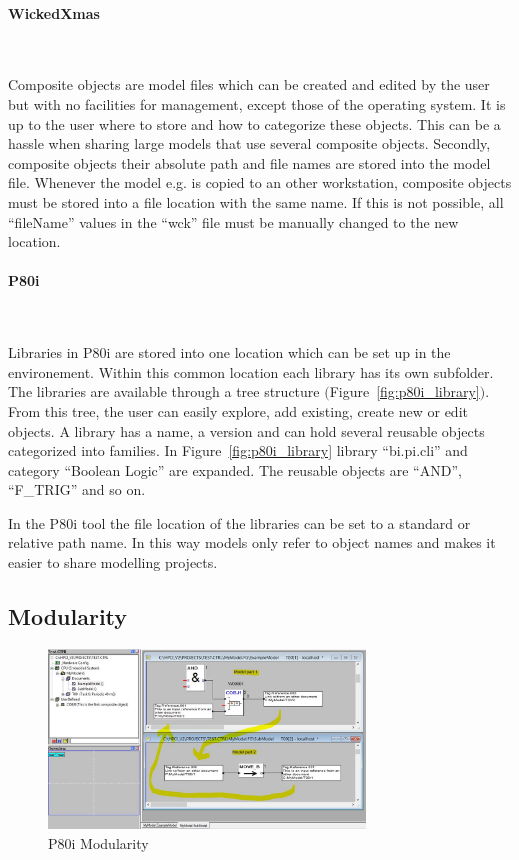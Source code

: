 \documentclass[a4paper,11pt,final]{article}
\begin{document}
\paragraph{WickedXmas}\

Composite objects are model files which can be created and edited by the user but
with no facilities for management, except those of the operating system.
It is up to the user where to store and how to categorize these objects.
This can be a hassle when sharing large models that use several composite objects.
Secondly, composite objects their absolute path and file names
are stored into the model file. Whenever the model e.g. is copied to an other workstation, 
composite objects must be stored into a file location with the same name.
If this is not possible, all ``fileName'' values in the ``wck'' file must be manually changed to the new location.

\paragraph{P80i}\

Libraries in P80i are stored into one location which can be set up in the environement.
Within this common location each library has its own subfolder.
The libraries are available through a tree structure $($Figure~\ref{fig:p80i_library}$)$.
From this tree, the user can easily explore, add existing, create new or edit objects.
A library has a name, a version and can hold several reusable objects categorized
into families. In Figure~\ref{fig:p80i_library} library ``bi.pi.cli'' and category
``Boolean Logic'' are expanded. The reusable objects are ``AND'', ``F\_TRIG'' and so on.

In the P80i tool the file location of the libraries can be set to a standard or relative path name.
In this way models only refer to object names and makes it easier to share modelling projects.

\subsection{Modularity}

\begin{figure}[here]
\center
\includegraphics[width=0.75\textwidth]{p80i_modularity}
\caption{P80i Modularity}
\label{fig:p80i_modularity}
\end{figure}
\end{document}
